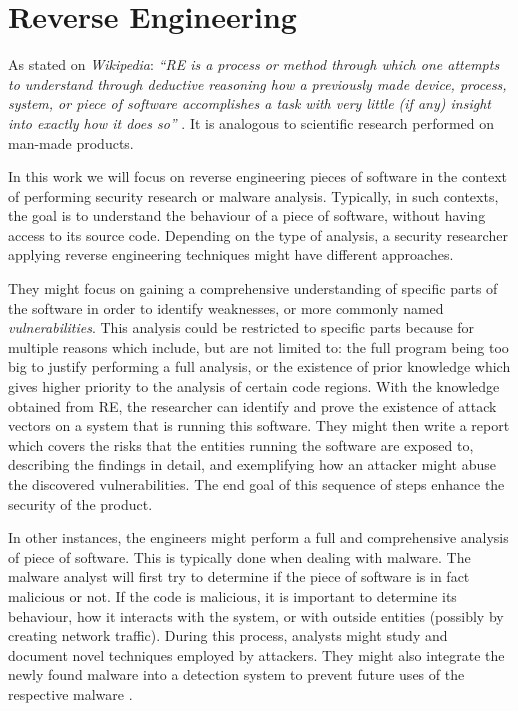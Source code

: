 \section{Reverse Engineering}
\label{sec:reverse_engineering}

As stated on \emph{Wikipedia}: \emph{``\gls{RE} is a process or method through which one attempts to understand through deductive reasoning how a previously made device, process, system, or piece of software accomplishes a task with very little (if any) insight into exactly how it does so''} \cite{re_wiki}. It is analogous to scientific research performed on man-made products.

In this work we will focus on reverse engineering pieces of software in the context of performing security research or malware analysis. Typically, in such contexts, the goal is to understand the behaviour of a piece of software, without having access to its source code. Depending on the type of analysis, a security researcher applying reverse engineering techniques might have different approaches. 

They might focus on gaining a comprehensive understanding of specific parts of the software in order to identify weaknesses, or more commonly named \emph{vulnerabilities}. This analysis could be restricted to specific parts because for multiple reasons which include, but are not limited to: the full program being too big to justify performing a full analysis, or the existence of prior knowledge which gives higher priority to the analysis of certain code regions. With the knowledge obtained from RE, the researcher can identify and prove the existence of attack vectors on a system that is running this software. They might then write a report which covers the risks that the entities running the software are exposed to, describing the findings in detail, and exemplifying how an attacker might abuse the discovered vulnerabilities. The end goal of this sequence of steps enhance the security of the product.

In other instances, the engineers might perform a full and comprehensive analysis of piece of software. This is typically done when dealing with malware. The malware analyst will first try to determine if the piece of software is in fact malicious or not. If the code is malicious, it is important to determine its behaviour, how it interacts with the system, or with outside entities (possibly by creating network traffic). During this process, analysts might study and document novel techniques employed by attackers. They might also integrate the newly found malware into a detection system to prevent future uses of the respective malware \cite{malware_crowdstrike}.

